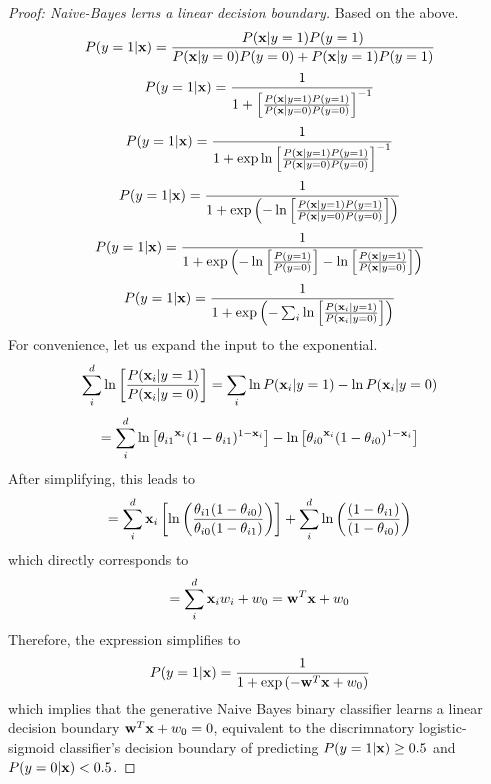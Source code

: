 \documentclass{article}
\def\x{{\bf x}}
\def\w{{\bf w}}
\begin{document}
\begin{enumerate}
{\begin{proof}[Proof: Naive-Bayes lerns a linear decision boundary]
    Based on the above.
    $$
        P(y=1|\x) = \frac{P(\x|y=1)P(y=1)}{P(\x|y=0)P(y=0) + P(\x|y=1)P(y=1)}
    $$
    $$
        P(y=1|\x) = \frac{1}{1 + \left[\frac{P(\x|y=1)P(y=1)}{P(\x|y=0)P(y=0)}\right]^{-1}}
    $$
    $$
        P(y=1|\x) = \frac{1}{1 + \exp \ln \left[\frac{P(\x|y=1)P(y=1)}{P(\x|y=0)P(y=0)}\right]^{-1}}
    $$
    $$
        P(y=1|\x) = \frac{1}{1 + \exp \left(- \ln \left[\frac{P(\x|y=1)P(y=1)}{P(\x|y=0)P(y=0)}\right]\right)}
    $$
    $$
        P(y=1|\x) = \frac{1}{1 + \exp \left(- \ln \left[\frac{P(y=1)}{P(y=0)}\right] - \ln \left[\frac{P(\x|y=1)}{P(\x|y=0)}\right]\right)}
    $$           
    $$
        P(y=1|\x) = \frac{1}{1 + \exp \left(- \sum_i \ln \left[\frac{P(\x_i|y=1)}{P(\x_i|y=0)}\right]\right)}
    $$
    For convenience, let us expand the input to the exponential.
    $$
        \sum_i^{d} \ln \left[\frac{P(\x_i|y=1)}{P(\x_i|y=0)}\right] = \sum_i \ln P(\x_i|y=1) - \ln P(\x_i|y=0)
    $$    
    $$
        = \sum_i^{d}  \ln \left[{\theta_{i1}}^{\x_i}(1-{\theta_{i1}})^{1-\x_i}\right] - \ln \left[{\theta_{i0}}^{\x_i}(1-{\theta_{i0}})^{1-\x_i}\right]
    $$
    After simplifying, this leads to
    $$
        = \sum_i^{d}  \x_i \left[ \ln \left( \frac{\theta_{i1}(1-\theta_{i0})}{\theta_{i0}(1-\theta_{i1})} \right) \right] + \sum_i^{d} \ln \left( \frac{(1-\theta_{i1})}{(1-\theta_{i0})} \right)
    $$
    which directly corresponds to
    $$
        = \sum_i^{d} \x_i w_i + w_0 = \w^T\x + w_0
    $$
    Therefore, the expression simplifies to
    $$
        P(y=1|\x) = \frac{1}{1 + \exp \left(- \w^T\x + w_0\right)}
    $$
    which implies that the generative Naive Bayes binary classifier learns a linear decision boundary
    $\w^T\x + w_0 = 0$, equivalent to the discrimnatory logistic-sigmoid classifier's decision boundary of predicting $P(y=1|\x) \ge 0.5$ and $P(y=0|\x) < 0.5$.

\end{proof}


}
\end{enumerate}
\end{document}
